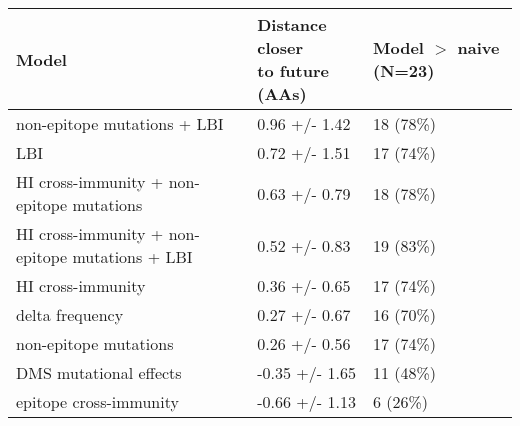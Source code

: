 \begin{tabular}{lll}
\toprule
                                           Model & \makecell{Distance closer \\ to future (AAs)} & \makecell{Model $>$ naive \\ (N=23)} \\
\midrule
                     non-epitope mutations + LBI &                                 0.96 +/- 1.42 &                            18 (78\%) \\
                                             LBI &                                 0.72 +/- 1.51 &                            17 (74\%) \\
       HI cross-immunity + non-epitope mutations &                                 0.63 +/- 0.79 &                            18 (78\%) \\
 HI cross-immunity + non-epitope mutations + LBI &                                 0.52 +/- 0.83 &                            19 (83\%) \\
                               HI cross-immunity &                                 0.36 +/- 0.65 &                            17 (74\%) \\
                                 delta frequency &                                 0.27 +/- 0.67 &                            16 (70\%) \\
                           non-epitope mutations &                                 0.26 +/- 0.56 &                            17 (74\%) \\
                          DMS mutational effects &                                -0.35 +/- 1.65 &                            11 (48\%) \\
                          epitope cross-immunity &                                -0.66 +/- 1.13 &                             6 (26\%) \\
\bottomrule
\end{tabular}
